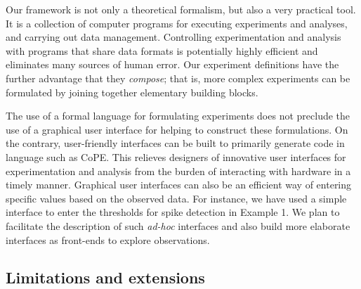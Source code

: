 Our framework is not only a theoretical formalism, but also a very
practical tool. It is a collection of computer programs for executing
experiments and analyses, and carrying out data
management. Controlling experimentation and analysis with programs
that share data formats is potentially highly efficient and eliminates
many sources of human error. Our experiment definitions have the
further advantage that they \emph{compose}; that is, more complex
experiments can be formulated by joining together elementary building
blocks. 

The use of a formal language for formulating experiments does not
preclude the use of a graphical user interface for helping to
construct these formulations. On the contrary, user-friendly
interfaces can be built to primarily generate code in language such as
CoPE. This relieves designers of innovative user interfaces for
experimentation and analysis from the burden of interacting with
hardware in a timely manner. Graphical user interfaces can also be an
efficient way of entering specific values based on the observed
data. For instance, we have used a simple interface to enter the
thresholds for spike detection in Example 1. We plan to facilitate the
description of such \emph{ad-hoc} interfaces and also build more
elaborate interfaces as front-ends to explore observations.

\subsection*{Limitations and extensions}

